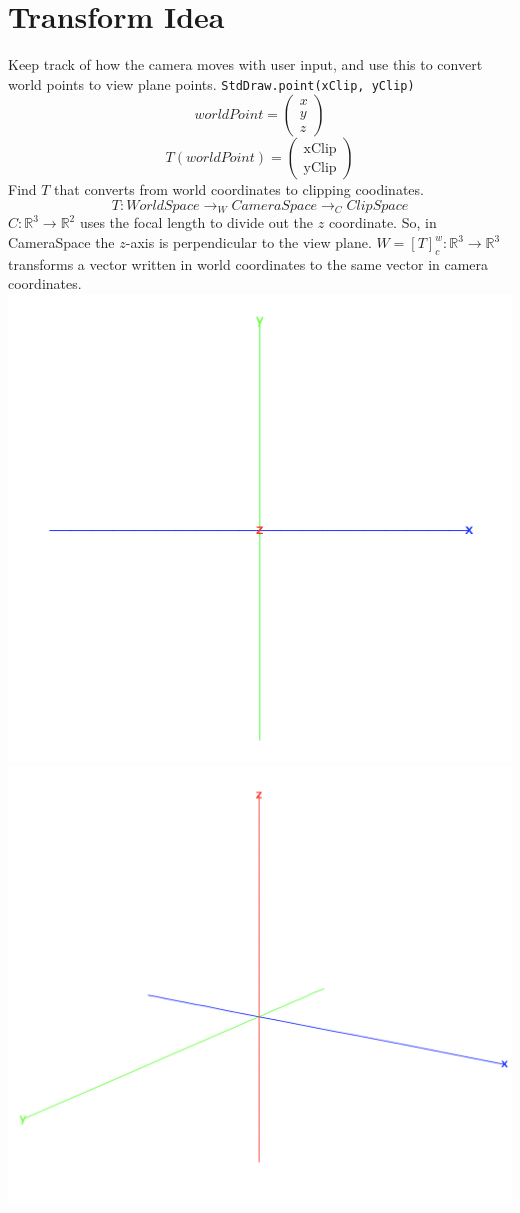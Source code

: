 \documentclass{article}
\begin{document}
\section{Transform Idea}
Keep track of how the camera moves with user input, and use this to convert world points to view plane points.
\texttt{StdDraw.point(xClip, yClip)}
    \[worldPoint =  \begin{pmatrix}
    x \\ y \\ z
    \end{pmatrix}\]
    \[T(worldPoint) = \begin{pmatrix}
    \text{xClip} \\ \text{yClip}
    \end{pmatrix}\]
Find $T$ that converts from world coordinates to clipping coodinates.
\[T: WorldSpace \longrightarrow_W CameraSpace \longrightarrow_C ClipSpace\]
$C: \mathbb{R}^3 \to \mathbb{R}^2$ uses the focal length to divide out the $z$ coordinate.
So, in CameraSpace the $z$-axis is perpendicular to the view plane.
\newline\newline $W = [T]_c^w: \mathbb{R}^3 \to \mathbb{R}^3$ transforms a vector written in world coordinates to the same vector in camera coordinates.
\newline\includegraphics[scale=0.5]{3d000.png}
\newline\includegraphics[scale=0.5]{3dxyz.png}
\end{document}
